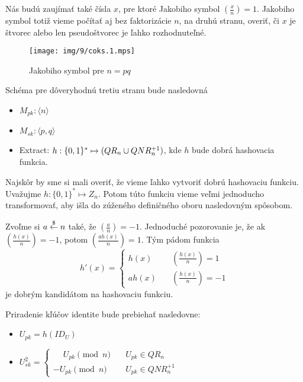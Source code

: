 \def\jacobi#1#2{\left( \frac{#1}{#2} \right)}

Nás budú zaujímať také čísla $x$, pre ktoré Jakobiho symbol
$\jacobi{x}{n} =1$. Jakobiho symbol totiž vieme počítať aj bez
faktorizácie $n$, na druhú stranu, overiť, či $x$ je štvorec alebo len
pseudoštvorec je ľahko rozhodnuteľné.

\begin{figure}[h]
    \centering
    \texttt{[image: img/9/coks.1.mps]}
    \caption{Jakobiho symbol pre $n=pq$}
    \label{fig:jakobi}
\end{figure}


Schéma pre dôveryhodnú tretiu stranu bude nasledovná
\begin{itemize}
    \item $M_{pk}: \langle n \rangle$
    \item $M_{sk}: \langle p,q \rangle$
    \item Extract: $h: \{0,1\}^* \mapsto (QR_n \cup QNR_n^{+1})$,
    kde $h$ bude dobrá hashovacia funkcia.
\end{itemize}

Najskôr by sme si mali overiť, že vieme ľahko vytvoriť dobrú
hashovaciu funkciu. Uvažujme $h:\{0,1\}^* \mapsto Z_n$.
Potom túto funkciu vieme veľmi jednoducho transformovať, aby išla do
zúženého definičného oboru nasledovným spôsobom.

Zvoľme si $a \overset{\$}{\leftarrow} n$ také, že $\jacobi{a}{n} = -1$.
Jednoduché pozorovanie je, že ak $\jacobi{h(x)}{n}=-1$,
potom $\jacobi{a h(x)}{n}=1$.
Tým pádom funkcia
\begin{equation*}
h'(x) = \begin{cases}
            h(x)   \quad &\jacobi{h(x)}{n}=1 \\
            a h(x) \quad &\jacobi{h(x)}{n}=-1
        \end{cases}
\end{equation*}
je dobrým kandidátom na hashovaciu funkciu.

Priradenie kľúčov identite bude prebiehať nasledovne:
\begin{itemize}
    \item $U_{pk}=h(ID_U)$

    \item $U_{sk}^2=\begin{cases}
            \phantom{-} U_{pk}\pmod{n}  \quad& U_{pk} \in QR_n \\
                     -  U_{pk}\pmod{n}  \quad& U_{pk} \in QNR_n^{+1}
                    \end{cases}$
\end{itemize}

